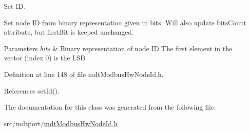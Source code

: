 Set I\-D. 

Set node I\-D from binary representation given in bits. Will also update bits\-Count attribute, but first\-Bit is keeped unchanged.


\begin{DoxyParams}{Parameters}
{\em bits} & Binary representation of node I\-D The first element in the vector (index 0) is the L\-S\-B \\
\hline
\end{DoxyParams}


Definition at line 148 of file mdt\-Modbus\-Hw\-Node\-Id.\-h.



References set\-Id().



The documentation for this class was generated from the following file\-:\begin{DoxyCompactItemize}
\item 
src/mdtport/\hyperlink{mdt_modbus_hw_node_id_8h}{mdt\-Modbus\-Hw\-Node\-Id.\-h}\end{DoxyCompactItemize}
